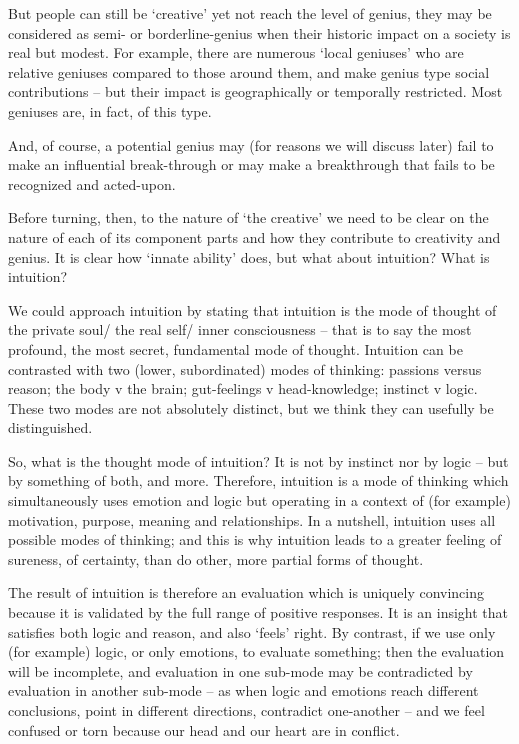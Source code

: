 \documentclass[
]{book}
\begin{document}
But people can still be `creative' yet not reach the level of genius, they may be considered as semi- or borderline-genius when their historic impact on a society is real but modest. For example, there are numerous `local geniuses' who are relative geniuses compared to those around them, and make genius type social contributions -- but their impact is geographically or temporally restricted. Most geniuses are, in fact, of this type.

And, of course, a potential genius may (for reasons we will discuss later) fail to make an influential break-through or may make a breakthrough that fails to be recognized and acted-upon.

Before turning, then, to the nature of `the creative' we need to be clear on the nature of each of its component parts and how they contribute to creativity and genius. It is clear how `innate ability' does, but what about intuition? What is intuition?

We could approach intuition by stating that intuition is the mode of thought of the private soul/ the real self/ inner consciousness -- that is to say the most profound, the most secret, fundamental mode of thought. Intuition can be contrasted with two (lower, subordinated) modes of thinking: passions versus reason; the body v the brain; gut-feelings v head-knowledge; instinct v logic. These two modes are not absolutely distinct, but we think they can usefully be distinguished.

So, what is the thought mode of intuition? It is not by instinct nor by logic -- but by something of both, and more. Therefore, intuition is a mode of thinking which simultaneously uses emotion and logic but operating in a context of (for example) motivation, purpose, meaning and relationships. In a nutshell, intuition uses all possible modes of thinking; and this is why intuition leads to a greater feeling of sureness, of certainty, than do other, more partial forms of thought.

The result of intuition is therefore an evaluation which is uniquely convincing because it is validated by the full range of positive responses. It is an insight that satisfies both logic and reason, and also `feels' right. By contrast, if we use only (for example) logic, or only emotions, to evaluate something; then the evaluation will be incomplete, and evaluation in one sub-mode may be contradicted by evaluation in another sub-mode -- as when logic and emotions reach different conclusions, point in different directions, contradict one-another -- and we feel confused or torn because our head and our heart are in conflict.
\end{document}
